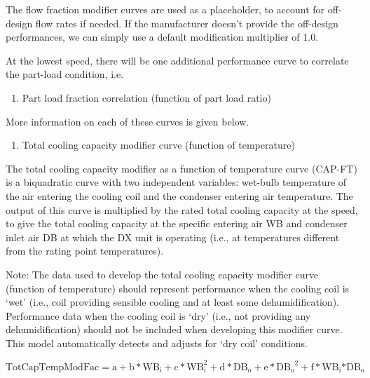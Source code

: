 The flow fraction modifier curves are used as a placeholder, to account for off-design flow rates if needed. If the manufacturer doesn't provide the off-design performances, we can simply use a default modification multiplier of 1.0.

At the lowest speed, there will be one additional performance curve to correlate the part-load condition, i.e.

\begin{enumerate}
\def\labelenumi{\arabic{enumi})}
\setcounter{enumi}{4}
\tightlist
\item
  Part load fraction correlation (function of part load ratio)
\end{enumerate}

More information on each of these curves is given below.

\begin{enumerate}
\def\labelenumi{\arabic{enumi})}
\item Total cooling capacity modifier curve (function of temperature)
\end{enumerate}

The total cooling capacity modifier as a function of temperature curve (CAP-FT) is a biquadratic curve with two independent variables: wet-bulb temperature of the air entering the cooling coil and the condenser entering air temperature. The output of this curve is multiplied by the rated total cooling capacity at the speed, to give the total cooling capacity at the specific entering air WB and condenser inlet air DB at which the DX unit is operating (i.e., at temperatures different from the rating point temperatures).

Note: The data used to develop the total cooling capacity modifier curve (function of temperature) should represent performance when the cooling coil is `wet' (i.e., coil providing sensible cooling and at least some dehumidification). Performance data when the cooling coil is `dry' (i.e., not providing any dehumidification) should not be included when developing this modifier curve. This model automatically detects and adjusts for `dry coil' conditions.

\begin{equation}
{\mathrm{TotCapTempModFac}} = {\mathrm{a}} + {\mathrm{b*W}}{{\mathrm{B}}_{\mathrm{i}}} + {\mathrm{c*WB}}_{\mathrm{i}}^2 + {\mathrm{d*D}}{{\mathrm{B}}_{\mathrm{o}}} + {\mathrm{e*D}}{{\mathrm{B}}_{\mathrm{o}}}^2 + {\mathrm{f*W}}{{\mathrm{B}}_{\mathrm{i}}}{\mathrm{*D}}{{\mathrm{B}}_{\mathrm{o}}}
\end{equation}

